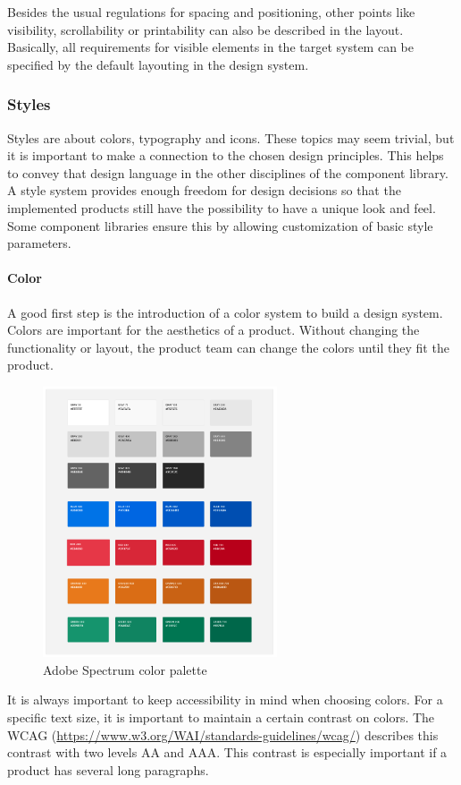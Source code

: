 Besides the usual regulations for spacing and positioning, other points like visibility, scrollability or printability can also be described in the layout. Basically, all requirements for visible elements in the target system can be specified by the default layouting in the design system.

\subsubsection{Styles}
Styles are about colors, typography and icons. These topics may seem trivial, but it is important to make a connection to the chosen design principles. This helps to convey that design language in the other disciplines of the component library. \\
A style system provides enough freedom for design decisions so that the implemented products still have the possibility to have a unique look and feel. Some component libraries ensure this by allowing customization of basic style parameters.\cite{vesselov_building_2019}

\paragraph{Color}
A good first step is the introduction of a color system to build a design system. Colors are important for the aesthetics of a product.
Without changing the functionality or layout, the product team can change the colors until they fit the product. \\
\begin{figure}[htbp]
	\centerline{\includegraphics[height=8cm]{images/adobe_spectrum_color_palette.png}}
	\caption{Adobe Spectrum color palette \cite{spectrum_adobe_spectrum_nodate}}
	\label{adobe_spectrum_colors}
\end{figure}
It is always important to keep accessibility in mind when choosing colors. For a specific text size, it is important to maintain a certain contrast on colors. The WCAG (\url{https://www.w3.org/WAI/standards-guidelines/wcag/}) describes this contrast with two levels AA and AAA. This contrast is especially important if a product has several long paragraphs.  \\

